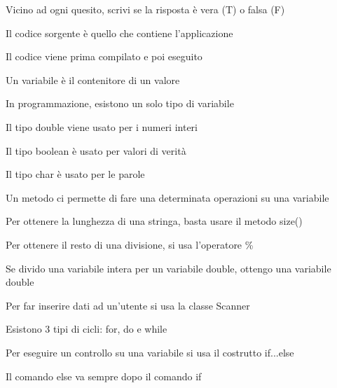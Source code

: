 \documentclass[addpoints]{exam}
\newcommand{\tf}[1][{}]{%
	\fillin[#1][0.25in]%
}
\begin{document}
 
\begin{center}
\end{center} 
 
\vspace{5mm}
 
 
\vspace{5mm}
 
Vicino ad ogni quesito, scrivi se la risposta è vera (T) o falsa (F)
\begin{multicols}{2}
\begin{questions}

\question \tf[F] Il codice sorgente è quello che contiene l'applicazione

\question \tf[T] Il codice viene prima compilato e poi eseguito

\question \tf[T] Un variabile è il contenitore di un valore

\question \tf[F] In programmazione, esistono un solo tipo di variabile

\question \tf[F] Il tipo double viene usato per i numeri interi

\question \tf[T] Il tipo boolean è usato per valori di verità

\question \tf[T] Il tipo char è usato per le parole

\question \tf[T] Un metodo ci permette di fare una determinata operazioni su una variabile

\question \tf[T] Per ottenere la lunghezza di una stringa, basta usare il metodo size()

\question \tf[T] Per ottenere il resto di una divisione, si usa l'operatore \%

\question \tf[F] Se divido una variabile intera per un variabile double, ottengo una variabile double

\question \tf[T] Per far inserire dati ad un'utente si usa la classe Scanner

\question \tf[T] Esistono 3 tipi di cicli: for, do e while

\question \tf[T] Per eseguire un controllo su una variabile si usa il costrutto if...else

\question \tf[T] Il comando else va sempre dopo il comando if


\end{questions}
\end{multicols}
\end{document}
